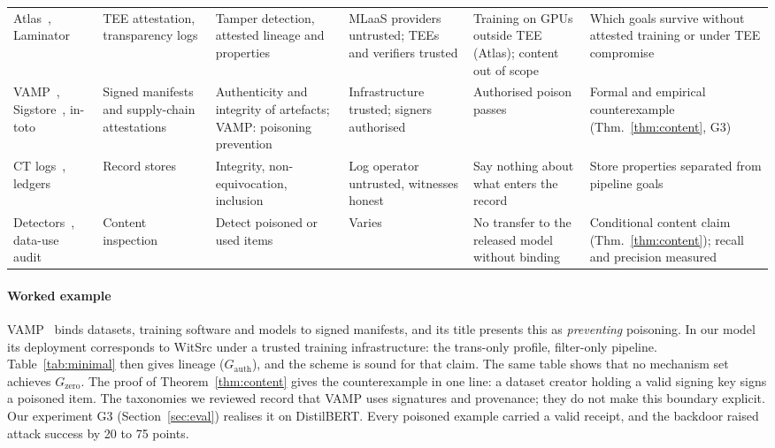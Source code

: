 \begin{table}[t]
\begin{tabular}{@{}p{2.1cm}p{2.2cm}p{2.4cm}p{2.3cm}p{3.1cm}p{3.4cm}@{}}
Atlas~\cite{spoczynski2025atlas}, Laminator~\cite{duddu2025laminator} & TEE attestation, transparency logs & Tamper detection, attested lineage and properties & MLaaS providers untrusted; TEEs and verifiers trusted & Training on GPUs outside TEE (Atlas); content out of scope & Which goals survive without attested training or under TEE compromise\\
VAMP~\cite{stokes2021prevent}, Sigstore~\cite{newman2022sigstore}, in-toto~\cite{torresarias2019intoto} & Signed manifests and supply-chain attestations & Authenticity and integrity of artefacts; VAMP: poisoning prevention & Infrastructure trusted; signers authorised & Authorised poison passes & Formal and empirical counterexample (Thm.~\ref{thm:content}, G3)\\
CT logs~\cite{rfc6962}, ledgers~\cite{mehammed2025fl,li2025auditablellm} & Record stores & Integrity, non-equivocation, inclusion & Log operator untrusted, witnesses honest & Say nothing about what enters the record & Store properties separated from pipeline goals\\
Detectors~\cite{tran2018spectral,hailemariam2025poisonspot}, data-use audit~\cite{huang2024datause} & Content inspection & Detect poisoned or used items & Varies & No transfer to the released model without binding & Conditional content claim (Thm.~\ref{thm:content}); recall and precision measured\\
\bottomrule
\end{tabular}
\end{table}

\paragraph{Worked example}
VAMP~\cite{stokes2021prevent} binds datasets, training software and models to signed
manifests, and its title presents this as \emph{preventing} poisoning. In our model its
deployment corresponds to \textsf{WitSrc} under a trusted training infrastructure: the
trans-only profile, filter-only pipeline. Table~\ref{tab:minimal} then gives lineage
($G_{\mathrm{auth}}$), and the scheme is sound for that claim. The same table shows that no
mechanism set achieves $G_{\mathrm{zero}}$. The proof of Theorem~\ref{thm:content} gives the
counterexample in one line: a dataset creator holding a valid signing key signs a poisoned
item. The taxonomies we reviewed record that VAMP uses signatures and provenance; they do not
make this boundary explicit. Our experiment G3 (Section~\ref{sec:eval}) realises it on
DistilBERT. Every poisoned example carried a valid receipt, and the backdoor raised attack
success by 20 to 75 points.

